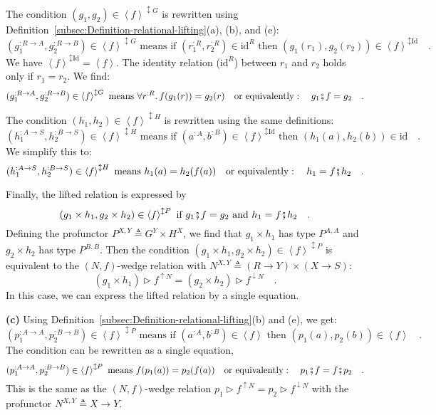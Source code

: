 The condition $(g_{1},g_{2})\in\left<f\right>^{\updownarrow G}$ is
rewritten using Definition~\ref{subsec:Definition-relational-lifting}(a),
(b), and (e):
\[
(g_{1}^{:R\rightarrow A},g_{2}^{:R\rightarrow B})\in\left<f\right>^{\updownarrow G}\text{ means if }(r_{1}^{:R},r_{2}^{:R})\in\text{id}^{R}\text{ then }(g_{1}(r_{1}),g_{2}(r_{2}))\in\left<f\right>^{\updownarrow\text{Id}}\quad.
\]
We have $\left<f\right>^{\updownarrow\text{Id}}=\left<f\right>$.
The identity relation ($\text{id}^{R}$) between $r_{1}$ and $r_{2}$
holds only if $r_{1}=r_{2}$. We find:
\[
(g_{1}^{:R\rightarrow A},g_{2}^{:R\rightarrow B})\in\left<f\right>^{\updownarrow G}\text{ means }\forall r^{:R}.\,f(g_{1}(r))=g_{2}(r)\quad\text{or equivalently}:\quad g_{1}\bef f=g_{2}\quad.
\]

The condition $(h_{1},h_{2})\in\left<f\right>^{\updownarrow H}$ is
rewritten using the same definitions:
\[
(h_{1}^{:A\rightarrow S},h_{2}^{:B\rightarrow S})\in\left<f\right>^{\updownarrow H}\text{ means if }(a^{:A},b^{:B})\in\left<f\right>^{\updownarrow\text{Id}}\text{ then }(h_{1}(a),h_{2}(b))\in\text{id}\quad.
\]
We simplify this to:
\[
(h_{1}^{:A\rightarrow S},h_{2}^{:B\rightarrow S})\in\left<f\right>^{\updownarrow H}\text{ means }h_{1}(a)=h_{2}(f(a))\quad\text{or equivalently}:\quad h_{1}=f\bef h_{2}\quad.
\]

Finally, the lifted relation is expressed by
\[
(g_{1}\times h_{1},g_{2}\times h_{2})\in\left<f\right>^{\updownarrow P}\text{ if }g_{1}\bef f=g_{2}\text{ and }h_{1}=f\bef h_{2}\quad.
\]
Defining the profunctor $P^{X,Y}\triangleq G^{Y}\times H^{X}$, we
find that $g_{1}\times h_{1}$ has type $P^{A,A}$ and $g_{2}\times h_{2}$
has type $P^{B,B}$. Then the condition $(g_{1}\times h_{1},g_{2}\times h_{2})\in\left<f\right>^{\updownarrow P}$
is equivalent to the $\left(N,f\right)$-wedge relation with $N^{X,Y}\triangleq\left(R\rightarrow Y\right)\times\left(X\rightarrow S\right)$:
\[
(g_{1}\times h_{1})\triangleright f^{\uparrow N}=(g_{2}\times h_{2})\triangleright f^{\downarrow N}\quad.
\]
In this case, we can express the lifted relation by a single equation.

\textbf{(c)} Using Definition~\ref{subsec:Definition-relational-lifting}(b)
and (e), we get:
\[
(p_{1}^{:A\rightarrow A},p_{2}^{:B\rightarrow B})\in\left<f\right>^{\updownarrow P}\text{ means if }(a^{:A},b^{:B})\in\left<f\right>\text{ then }(p_{1}(a),p_{2}(b))\in\left<f\right>\quad.
\]
The condition can be rewritten as a single equation,
\[
(p_{1}^{:A\rightarrow A},p_{2}^{:B\rightarrow B})\in\left<f\right>^{\updownarrow P}\text{ means }f(p_{1}(a))=p_{2}(f(a))\quad\text{or equivalently}:\quad p_{1}\bef f=f\bef p_{2}\quad.
\]
This is the same as the $\left(N,f\right)$-wedge relation $p_{1}\triangleright f^{\uparrow N}=p_{2}\triangleright f^{\downarrow N}$
with the profunctor $N^{X,Y}\triangleq X\rightarrow Y$.

